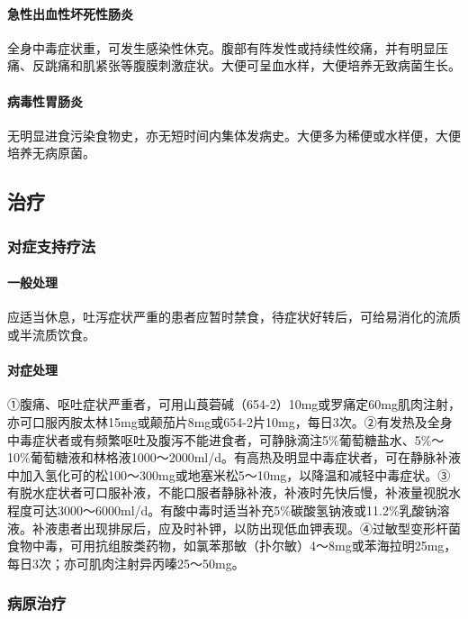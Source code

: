 \paragraph{急性出血性坏死性肠炎}

全身中毒症状重，可发生感染性休克。腹部有阵发性或持续性绞痛，并有明显压痛、反跳痛和肌紧张等腹膜刺激症状。大便可呈血水样，大便培养无致病菌生长。

\paragraph{病毒性胃肠炎}

无明显进食污染食物史，亦无短时间内集体发病史。大便多为稀便或水样便，大便培养无病原菌。

\subsection{治疗}

\subsubsection{对症支持疗法}

\paragraph{一般处理}

应适当休息，吐泻症状严重的患者应暂时禁食，待症状好转后，可给易消化的流质或半流质饮食。

\paragraph{对症处理}

①腹痛、呕吐症状严重者，可用山莨菪碱（654-2）10mg或罗痛定60mg肌肉注射，亦可口服丙胺太林15mg或颠茄片8mg或654-2片10mg，每日3次。②有发热及全身中毒症状者或有频繁呕吐及腹泻不能进食者，可静脉滴注5\%葡萄糖盐水、5\%～10\%葡萄糖液和林格液1000～2000ml/d。有高热及明显中毒症状者，可在静脉补液中加入氢化可的松100～300mg或地塞米松5～10mg，以降温和减轻中毒症状。③有脱水症状者可口服补液，不能口服者静脉补液，补液时先快后慢，补液量视脱水程度可达3000～6000ml/d。有酸中毒时适当补充5\%碳酸氢钠液或11.2\%乳酸钠溶液。补液患者出现排尿后，应及时补钾，以防出现低血钾表现。④过敏型变形杆菌食物中毒，可用抗组胺类药物，如氯苯那敏（扑尔敏）4～8mg或苯海拉明25mg，每日3次；亦可肌肉注射异丙嗪25～50mg。

\subsubsection{病原治疗}

